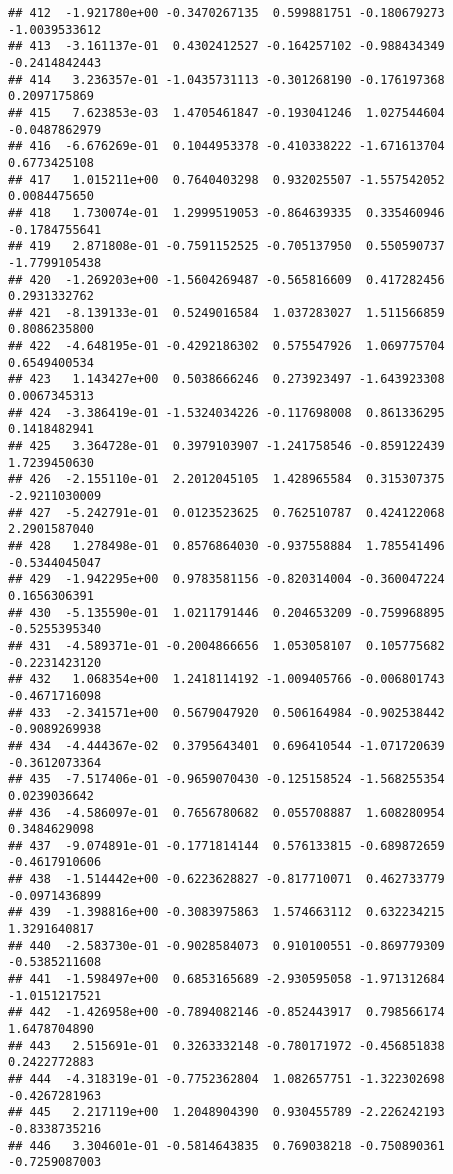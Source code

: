 \documentclass[
]{article}
\begin{document}
\begin{verbatim}
## 412  -1.921780e+00 -0.3470267135  0.599881751 -0.180679273 -1.0039533612
## 413  -3.161137e-01  0.4302412527 -0.164257102 -0.988434349 -0.2414842443
## 414   3.236357e-01 -1.0435731113 -0.301268190 -0.176197368  0.2097175869
## 415   7.623853e-03  1.4705461847 -0.193041246  1.027544604 -0.0487862979
## 416  -6.676269e-01  0.1044953378 -0.410338222 -1.671613704  0.6773425108
## 417   1.015211e+00  0.7640403298  0.932025507 -1.557542052  0.0084475650
## 418   1.730074e-01  1.2999519053 -0.864639335  0.335460946 -0.1784755641
## 419   2.871808e-01 -0.7591152525 -0.705137950  0.550590737 -1.7799105438
## 420  -1.269203e+00 -1.5604269487 -0.565816609  0.417282456  0.2931332762
## 421  -8.139133e-01  0.5249016584  1.037283027  1.511566859  0.8086235800
## 422  -4.648195e-01 -0.4292186302  0.575547926  1.069775704  0.6549400534
## 423   1.143427e+00  0.5038666246  0.273923497 -1.643923308  0.0067345313
## 424  -3.386419e-01 -1.5324034226 -0.117698008  0.861336295  0.1418482941
## 425   3.364728e-01  0.3979103907 -1.241758546 -0.859122439  1.7239450630
## 426  -2.155110e-01  2.2012045105  1.428965584  0.315307375 -2.9211030009
## 427  -5.242791e-01  0.0123523625  0.762510787  0.424122068  2.2901587040
## 428   1.278498e-01  0.8576864030 -0.937558884  1.785541496 -0.5344045047
## 429  -1.942295e+00  0.9783581156 -0.820314004 -0.360047224  0.1656306391
## 430  -5.135590e-01  1.0211791446  0.204653209 -0.759968895 -0.5255395340
## 431  -4.589371e-01 -0.2004866656  1.053058107  0.105775682 -0.2231423120
## 432   1.068354e+00  1.2418114192 -1.009405766 -0.006801743 -0.4671716098
## 433  -2.341571e+00  0.5679047920  0.506164984 -0.902538442 -0.9089269938
## 434  -4.444367e-02  0.3795643401  0.696410544 -1.071720639 -0.3612073364
## 435  -7.517406e-01 -0.9659070430 -0.125158524 -1.568255354  0.0239036642
## 436  -4.586097e-01  0.7656780682  0.055708887  1.608280954  0.3484629098
## 437  -9.074891e-01 -0.1771814144  0.576133815 -0.689872659 -0.4617910606
## 438  -1.514442e+00 -0.6223628827 -0.817710071  0.462733779 -0.0971436899
## 439  -1.398816e+00 -0.3083975863  1.574663112  0.632234215  1.3291640817
## 440  -2.583730e-01 -0.9028584073  0.910100551 -0.869779309 -0.5385211608
## 441  -1.598497e+00  0.6853165689 -2.930595058 -1.971312684 -1.0151217521
## 442  -1.426958e+00 -0.7894082146 -0.852443917  0.798566174  1.6478704890
## 443   2.515691e-01  0.3263332148 -0.780171972 -0.456851838  0.2422772883
## 444  -4.318319e-01 -0.7752362804  1.082657751 -1.322302698 -0.4267281963
## 445   2.217119e+00  1.2048904390  0.930455789 -2.226242193 -0.8338735216
## 446   3.304601e-01 -0.5814643835  0.769038218 -0.750890361 -0.7259087003

\end{verbatim}
\end{document}
